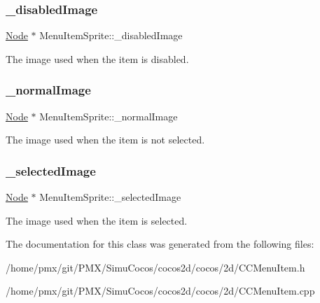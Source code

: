 \subsubsection{\texorpdfstring{\+\_\+disabled\+Image}{\_disabledImage}}
{\footnotesize\ttfamily \hyperlink{classNode}{Node} $\ast$ Menu\+Item\+Sprite\+::\+\_\+disabled\+Image\hspace{0.3cm}{\ttfamily [protected]}}

The image used when the item is disabled. \mbox{\label{classMenuItemSprite_ab3c368fb04937be8da28053aab3a7c06}} 
\subsubsection{\texorpdfstring{\+\_\+normal\+Image}{\_normalImage}}
{\footnotesize\ttfamily \hyperlink{classNode}{Node} $\ast$ Menu\+Item\+Sprite\+::\+\_\+normal\+Image\hspace{0.3cm}{\ttfamily [protected]}}

The image used when the item is not selected. \mbox{\label{classMenuItemSprite_ad962f8b01a3245d8bacf921ae70674aa}} 
\subsubsection{\texorpdfstring{\+\_\+selected\+Image}{\_selectedImage}}
{\footnotesize\ttfamily \hyperlink{classNode}{Node} $\ast$ Menu\+Item\+Sprite\+::\+\_\+selected\+Image\hspace{0.3cm}{\ttfamily [protected]}}

The image used when the item is selected. 

The documentation for this class was generated from the following files\+:\begin{DoxyCompactItemize}
\item 
/home/pmx/git/\+P\+M\+X/\+Simu\+Cocos/cocos2d/cocos/2d/C\+C\+Menu\+Item.\+h\item 
/home/pmx/git/\+P\+M\+X/\+Simu\+Cocos/cocos2d/cocos/2d/C\+C\+Menu\+Item.\+cpp\end{DoxyCompactItemize}
